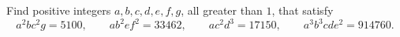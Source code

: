 Find positive integers $a,b,c,d,e,f,g$, all greater than $1$, that satisfy
\[
a^2bc^2g=5100,\qquad ab^2ef^2=33462,\qquad ac^2d^3=17150,\qquad a^3b^3cde^2=914760 .
\]
